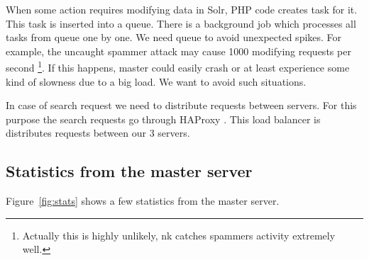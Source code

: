 \documentclass[10pt,a4paper]{article}
\begin{document}
When some action requires modifying data in Solr, PHP code creates task for it. This task is inserted into a queue. There is a background job which processes all tasks from queue one by one. We need queue to avoid unexpected spikes. For example, the uncaught spammer attack may cause 1000 modifying requests per second \footnote{Actually this is highly unlikely, nk catches spammers activity extremely well.}. If this happens, master could easily crash or at least experience some kind of slowness due to a big load. We want to avoid such situations. 

In case of search request we need to distribute requests between servers. For this purpose the search requests go through HAProxy \cite{HAPROXY}. This load balancer is distributes requests between our 3 servers.

\subsection{Statistics from the master server}

Figure~\ref{fig:stats} shows a few statistics from the master server.
\end{document}
